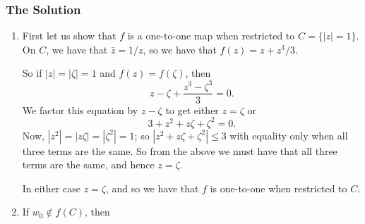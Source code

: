 \subsubsection*{The Solution}
\begin{enumerate}
\item First let us show that \(f\) is a one-to-one map when restricted to \(C = \{|z| = 1\}\). On \(C\),
we have that \(\bar z = 1 / z\), so we have that \(f(z) = z + z^3 / 3\). 

So if \(|z| = |\zeta| = 1\) and \(f(z) = f(\zeta)\), then 
\begin{equation}
z - \zeta + \frac{z^3 - \zeta^3}{3} = 0. 
\end{equation}
We factor this equation by \(z - \zeta\) to get either \(z =\zeta\) or
\begin{equation}
3 + z^2 + z\zeta + \zeta^2 = 0.
\end{equation}
Now, \(|z^2| = |z\zeta| = |\zeta^2| = 1\); so \(|z^2 + z\zeta + \zeta^2| \leq 3\) with equality only when
all three terms are the same. So from the above we must have that all three terms are the same, and hence
\(z = \zeta\).

In either case \(z = \zeta\), and so we have that \(f\) is one-to-one when restricted to \(C\).

\item If \(w_0 \not \in f(C)\), then 
\end{enumerate}
